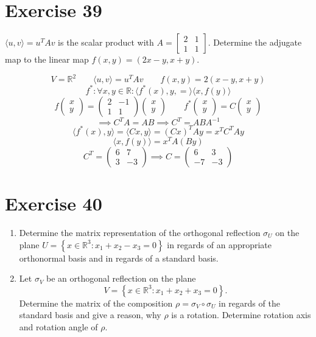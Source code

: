 \documentclass[a4paper]{article}
\theoremstyle{definition}
\newcommand\set[1]{\left\{#1\right\}}
\newcommand\ip[2]{\langle{#1},{#2}\rangle}
\begin{document}
\section{Exercise 39}
\begin{ex}
  $\ip uv = u^T Av$ is the scalar product with $A = \begin{bmatrix} 2 & 1 \\ 1 & 1 \end{bmatrix}$.
  Determine the adjugate map to the linear map $f(x,y) = (2x - y, x + y)$.
\end{ex}
\[ V = \mathbb R^2 \qquad \ip uv = u^T Av \qquad f(x,y) = 2(x-y,x+y) \]
\[ f^*: \forall x, y \in \mathbb R: \ip{f^*(x),y} = \ip{x}{f(y)} \]
\[ f\begin{pmatrix} x \\ y \end{pmatrix} = \begin{pmatrix} 2 & -1 \\ 1 & 1 \end{pmatrix} \begin{pmatrix} x \\ y \end{pmatrix} \qquad f^*\begin{pmatrix} x \\ y \end{pmatrix} = C\begin{pmatrix} x \\ y \end{pmatrix} \]
\[ \implies C^T A = AB \implies C^T = ABA^{-1} \]
\[ \ip{f^*(x)}{y} = \ip{Cx}{y} = (Cx)^T Ay = x^T C^T Ay \]
\[ \ip{x}{f(y)} = x^T A(By) \]
\[  C^T = \begin{pmatrix} 6 & 7 \\ 3 & -3 \end{pmatrix} \implies C = \begin{pmatrix} 6 & 3 \\ -7 & -3 \end{pmatrix} \]

\section{Exercise 40}
\begin{ex}
  \begin{enumerate}
    \item Determine the matrix representation of the orthogonal reflection $\sigma_U$ on the plane $U = \set{x \in \mathbb R^3: x_1 + x_2 - x_3 = 0}$
    in regards of an appropriate orthonormal basis and in regards of a standard basis.
    \item Let $\sigma_V$ be an orthogonal reflection on the plane
      \[ V = \set{x \in \mathbb R^3: x_1 + x_2 + x_3 = 0}. \]
      Determine the matrix of the composition $\rho = \sigma_V \circ \sigma_U$ in regards of the standard basis and give a reason, why $\rho$ is a rotation. Determine rotation axis and rotation angle of $\rho$.
  \end{enumerate}
\end{ex}
\end{document}

